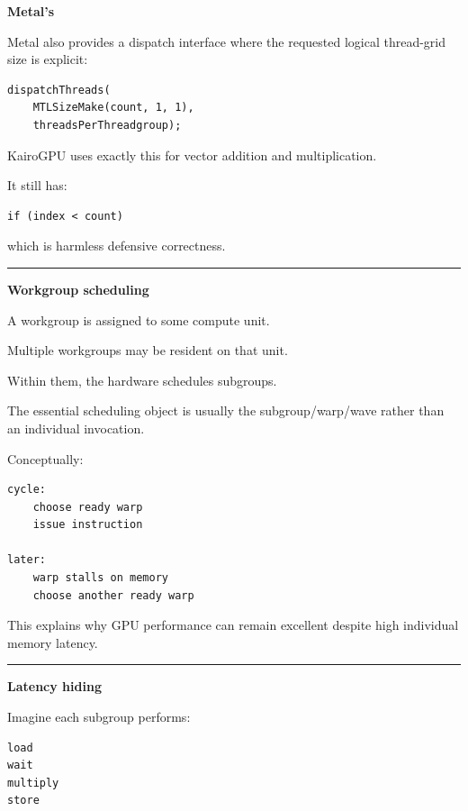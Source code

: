 \textbf{Metal's }

Metal also provides a dispatch interface where the requested logical thread-grid size is explicit:

\protect{}\label{d2ts06}%
\begin{verbatim}
dispatchThreads(
    MTLSizeMake(count, 1, 1),
    threadsPerThreadgroup);
\end{verbatim}

KairoGPU uses exactly this for vector addition and multiplication.

It still has:

\protect{}\label{ccmw1t}%
\begin{verbatim}
if (index < count)
\end{verbatim}

which is harmless defensive correctness.

\begin{center}\rule{0.5\linewidth}{0.5pt}\end{center}

\textbf{Workgroup scheduling}

A workgroup is assigned to some compute unit.

Multiple workgroups may be resident on that unit.

Within them, the hardware schedules subgroups.

The essential scheduling object is usually the subgroup/warp/wave rather than an individual invocation.

Conceptually:

\protect{}\label{r4h73i}%
\begin{verbatim}
cycle:
    choose ready warp
    issue instruction

later:
    warp stalls on memory
    choose another ready warp
\end{verbatim}

This explains why GPU performance can remain excellent despite high individual memory latency.

\begin{center}\rule{0.5\linewidth}{0.5pt}\end{center}

\textbf{Latency hiding}

Imagine each subgroup performs:

\protect{}\label{6d38i1}%
\begin{verbatim}
load
wait
multiply
store
\end{verbatim}

